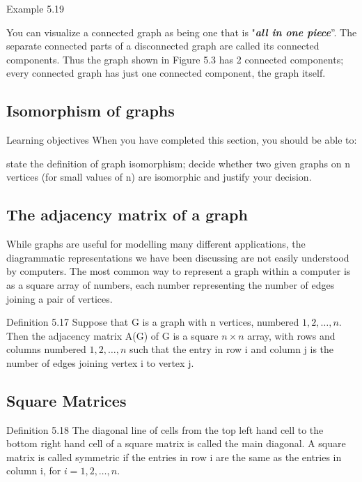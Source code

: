 \documentclass{article}
\begin{document}
Example 5.19 

You can visualize a connected graph as being one that is "\textit{\textbf{all in one piece}}''. The separate connected parts of a disconnected graph are called its connected components. Thus the graph shown in Figure 5.3 has 2 connected components; every connected graph has just one connected component, the graph itself.

	
\subsection*{Isomorphism of graphs}

Learning objectives
When you have completed this section, you should be able to:

state the definition of graph isomorphism;
decide whether two given graphs on n vertices (for small values of n) are isomorphic and justify your decision.


\subsection*{ The adjacency matrix of a graph}

While graphs are useful for modelling many different applications, the diagrammatic representations we have been discussing are not easily understood by computers. The most common way to represent a graph within a computer is as a square array of numbers, each number representing the number of edges joining a pair of vertices.

Definition 5.17 Suppose that G is a graph with n vertices, numbered $1, 2, \ldots , n$. Then the adjacency matrix A(G) of G is a square $n \times n$ array, with rows and columns numbered $1, 2, \ldots , n$ such that the entry in row i and column j is the number of edges joining vertex i to vertex j.


\subsection*{Square Matrices}
Definition 5.18 The diagonal line of cells from the top left hand cell to the bottom right hand cell of a square matrix is called the main diagonal. A square matrix is called symmetric if the entries in row i are the same as the entries in column i, for $i = 1, 2, \ldots , n$.
\end{document}
